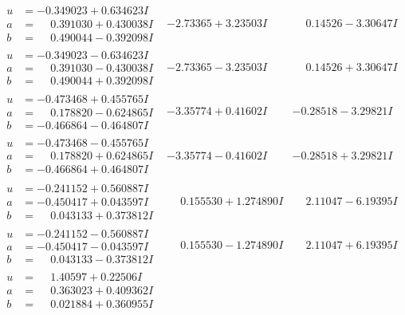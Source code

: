 \documentclass[1p]{elsarticle_modified}
\theoremstyle{definition}
\begin{document}
$$\begin{array}{c|c|c}
\begin{aligned}
u &= -0.349023 + 0.634623 I \\
a &= \phantom{-}0.391030 + 0.430038 I \\
b &= \phantom{-}0.490044 - 0.392098 I\end{aligned}
 & -2.73365 + 3.23503 I & \phantom{-}0.14526 - 3.30647 I \\ \hline\begin{aligned}
u &= -0.349023 - 0.634623 I \\
a &= \phantom{-}0.391030 - 0.430038 I \\
b &= \phantom{-}0.490044 + 0.392098 I\end{aligned}
 & -2.73365 - 3.23503 I & \phantom{-}0.14526 + 3.30647 I \\ \hline\begin{aligned}
u &= -0.473468 + 0.455765 I \\
a &= \phantom{-}0.178820 - 0.624865 I \\
b &= -0.466864 - 0.464807 I\end{aligned}
 & -3.35774 + 0.41602 I & -0.28518 - 3.29821 I \\ \hline\begin{aligned}
u &= -0.473468 - 0.455765 I \\
a &= \phantom{-}0.178820 + 0.624865 I \\
b &= -0.466864 + 0.464807 I\end{aligned}
 & -3.35774 - 0.41602 I & -0.28518 + 3.29821 I \\ \hline\begin{aligned}
u &= -0.241152 + 0.560887 I \\
a &= -0.450417 + 0.043597 I \\
b &= \phantom{-}0.043133 + 0.373812 I\end{aligned}
 & \phantom{-}0.155530 + 1.274890 I & \phantom{-}2.11047 - 6.19395 I \\ \hline\begin{aligned}
u &= -0.241152 - 0.560887 I \\
a &= -0.450417 - 0.043597 I \\
b &= \phantom{-}0.043133 - 0.373812 I\end{aligned}
 & \phantom{-}0.155530 - 1.274890 I & \phantom{-}2.11047 + 6.19395 I \\ \hline\begin{aligned}
u &= \phantom{-}1.40597 + 0.22506 I \\
a &= \phantom{-}0.363023 + 0.409362 I \\
b &= \phantom{-}0.021884 + 0.360955 I\end{aligned}

\end{array}$$
\end{document}
